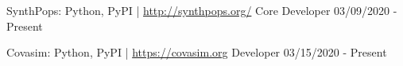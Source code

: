 \vspace{-3mm}
\vspace{-2mm}
\begin{cventries}

  \cvpresentation
    {SynthPops: Python, PyPI | \href{http://synthpops.org/}{http://synthpops.org/}} %
    {Core Developer} %
    {} %
    {03/09/2020 - Present} %

  \cvpresentation
    {Covasim: Python, PyPI | \href{https://covasim.org}{https://covasim.org}} %
    {Developer} %
    {} %
    {03/15/2020 - Present} %
\end{cventries}